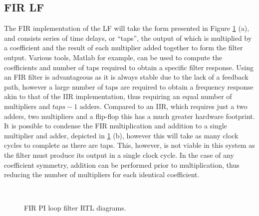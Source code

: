 \subsection{\ac{FIR} \acl{LF}}
The \ac{FIR} implementation of the \acl{LF} will take the form presented in Figure \ref{fig:fir_pi} (a), and consists series of time delays, or ``taps'', the output of which is multiplied by a coefficient and the result of each multiplier added together to form the filter output. Various tools, Matlab for example, can be used to compute the coefficients and number of taps required to obtain a specific filter response. Using an \ac{FIR} filter is advantageous as it is always stable due to the lack of a feedback path, however a large number of taps are required to obtain a frequency response akin to that of the \ac{IIR} implementation, thus requiring an equal number of multipliers and $taps-1$ adders. Compared to an \ac{IIR}, which requires just a two adders, two multipliers and a flip-flop this has a much greater hardware footprint. It is possible to condense the \ac{FIR} multiplication and addition to a single multiplier and adder, depicted in \ref{fig:fir_pi} (b), however this will take as many clock cycles to complete as there are taps. This, however, is not viable in this system as the filter must produce its output in a single clock cycle. In the case of any coefficient symmetry, addition can be performed prior to multiplication, thus reducing the number of multipliers for each identical coefficient.
\begin{figure}[h]
	\centering
	\\
	\caption[\ac{FIR} \ac{PI} loop filter RTL diagrams]{\ac{FIR} \ac{PI} loop filter RTL diagrams.}
	\label{fig:fir_pi}
\end{figure}

